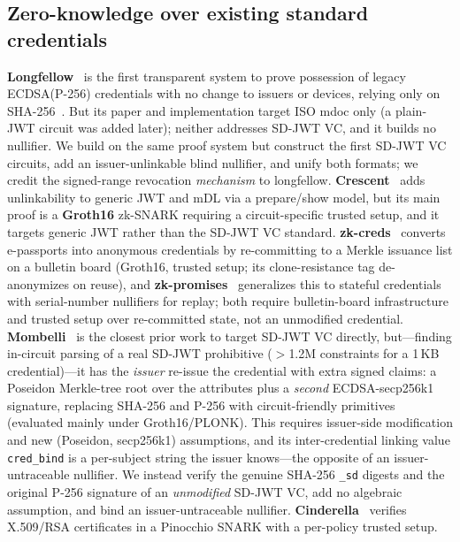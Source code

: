 \documentclass[11pt]{article}
\theoremstyle{plain}
\theoremstyle{definition}
\begin{document}
\subsection{Zero-knowledge over existing standard credentials}
\textbf{Longfellow}~\cite{frigo2024longfellow} is the first transparent system to prove
possession of legacy ECDSA(P-256) credentials with no change to issuers or devices,
relying only on SHA-256~\cite{libzk-draft}. But its paper and implementation target
ISO mdoc only (a plain-JWT circuit was added later); neither addresses SD-JWT VC, and
it builds no nullifier. We build on the same proof system but construct the first
SD-JWT VC circuits, add an issuer-unlinkable blind nullifier, and unify both formats;
we credit the signed-range revocation \emph{mechanism} to longfellow.
\textbf{Crescent}~\cite{paquin2024crescent} adds unlinkability to generic JWT and mDL
via a prepare/show model, but its main proof is a \textbf{Groth16} zk-SNARK requiring a
circuit-specific trusted setup, and it targets generic JWT rather than the SD-JWT VC
standard. \textbf{zk-creds}~\cite{rosenberg2023zkcreds} converts e-passports into
anonymous credentials by re-committing to a Merkle issuance list on a bulletin board
(Groth16, trusted setup; its clone-resistance tag de-anonymizes on reuse), and
\textbf{zk-promises}~\cite{shih2025zkpromises} generalizes this to stateful credentials
with serial-number nullifiers for replay; both require bulletin-board infrastructure
and trusted setup over re-committed state, not an unmodified credential.
\textbf{Mombelli}~\cite{mombelli2025zkvc} is the closest prior work to target SD-JWT VC
directly, but---finding in-circuit parsing of a real SD-JWT prohibitive ($>$1.2M
constraints for a 1\,KB credential)---it has the \emph{issuer} re-issue the credential
with extra signed claims: a Poseidon Merkle-tree root over the attributes plus a
\emph{second} ECDSA-secp256k1 signature, replacing SHA-256 and P-256 with
circuit-friendly primitives (evaluated mainly under Groth16/PLONK). This requires
issuer-side modification and new (Poseidon, secp256k1) assumptions, and its
inter-credential linking value \texttt{cred\_bind} is a per-subject string the issuer
knows---the opposite of an issuer-untraceable nullifier. We instead verify the genuine
SHA-256 \texttt{\_sd} digests and the original P-256 signature of an \emph{unmodified}
SD-JWT VC, add no algebraic assumption, and bind an issuer-untraceable nullifier.
\textbf{Cinderella}~\cite{delignat2016cinderella} verifies X.509/RSA certificates in a
Pinocchio SNARK with a per-policy trusted setup.
\end{document}
